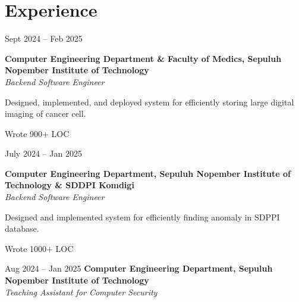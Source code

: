 \section{Experience}

    \begin{twocolentry}{
        Sept 2024 – Feb 2025
    }

    \textbf{Computer Engineering Department \& Faculty of Medics, Sepuluh Nopember Institute of Technology}\\
    \textit{Backend Software Engineer}
    \end{twocolentry}

    \vspace{0.10 cm}
    \begin{onecolentry}
        \begin{highlights}
            \item Designed, implemented, and deployed system for efficiently storing large digital imaging of cancer cell.
            \item Wrote 900+ LOC
        \end{highlights}
    \end{onecolentry}

    \vspace{0.2 cm}

    \begin{twocolentry}{
        July 2024 – Jan 2025
    }

    \textbf{Computer Engineering Department, Sepuluh Nopember Institute of Technology \& SDDPI Komdigi}\\
    \textit{Backend Software Engineer}
    \end{twocolentry}

    \vspace{0.10 cm}
    \begin{onecolentry}
        \begin{highlights}
            \item Designed and implemented system for efficiently finding anomaly in SDPPI database.
            \item Wrote 1000+ LOC
        \end{highlights}
    \end{onecolentry}

    \vspace{0.2 cm}

    \begin{twocolentry}{
        Aug 2024 – Jan 2025
    }
    \textbf{Computer Engineering Department, Sepuluh Nopember Institute of Technology}\\
    \textit{Teaching Assistant for Computer Security}
    \end{twocolentry}

